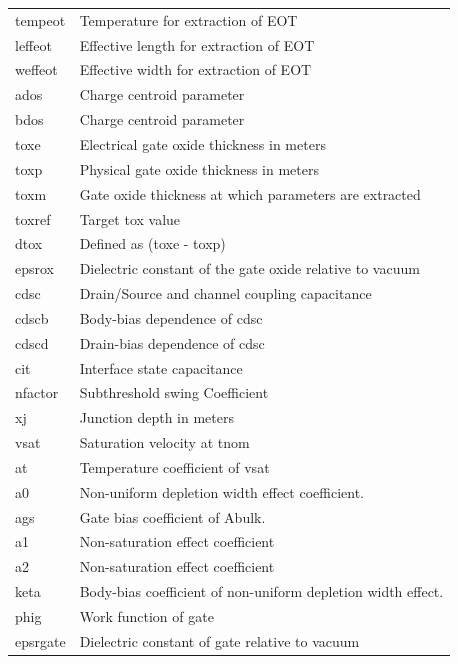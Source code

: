 \begin{longtable}{l l}
{\small tempeot} & {\small Temperature for extraction of EOT} \\
{\small leffeot} & {\small Effective length for extraction of EOT} \\
{\small weffeot} & {\small Effective width for extraction of EOT} \\
{\small ados} & {\small Charge centroid parameter} \\
{\small bdos} & {\small Charge centroid parameter} \\
{\small toxe} & {\small Electrical gate oxide thickness in meters} \\
{\small toxp} & {\small Physical gate oxide thickness in meters} \\
{\small toxm} & {\small Gate oxide thickness at which parameters are extracted} \\
{\small toxref} & {\small Target tox value} \\
{\small dtox} & {\small Defined as (toxe - toxp) } \\
{\small epsrox} & {\small Dielectric constant of the gate oxide relative to vacuum} \\
{\small cdsc} & {\small Drain/Source and channel coupling capacitance} \\
{\small cdscb} & {\small Body-bias dependence of cdsc} \\ 
{\small cdscd} & {\small Drain-bias dependence of cdsc} \\ 
{\small cit} & {\small Interface state capacitance} \\
{\small nfactor} & {\small Subthreshold swing Coefficient} \\
{\small xj} & {\small Junction depth in meters} \\
{\small vsat} & {\small Saturation velocity at tnom} \\
{\small at} & {\small Temperature coefficient of vsat} \\
{\small a0} & {\small Non-uniform depletion width effect coefficient.} \\ 
{\small ags} & {\small Gate bias  coefficient of Abulk.} \\ 
{\small a1} & {\small Non-saturation effect coefficient} \\
{\small a2} & {\small Non-saturation effect coefficient} \\
{\small keta} & {\small Body-bias coefficient of non-uniform depletion width effect.} \\
{\small phig} & {\small Work function of gate} \\
{\small epsrgate} & {\small Dielectric constant of gate relative to vacuum} \\

\end{longtable}
